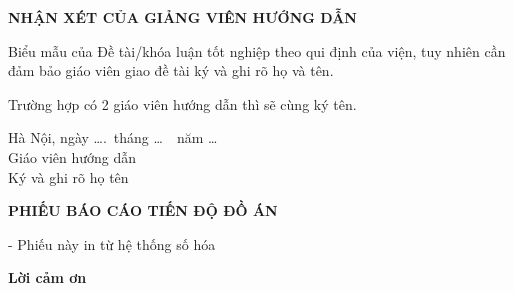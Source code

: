 \documentclass[12pt,a4paper]{report}
\begin{document}
\newpage

\begin{center}
    {\fontsize{13}{16}\selectfont\bfseries NHẬN XÉT CỦA GIẢNG VIÊN HƯỚNG DẪN}
\end{center}

\vspace{0.8cm}

Biểu mẫu của Đề tài/khóa luận tốt nghiệp theo qui định của viện, tuy nhiên cần đảm bảo giáo viên giao đề tài ký và ghi rõ họ và tên.

Trường hợp có 2 giáo viên hướng dẫn thì sẽ cùng ký tên.

\vspace{9cm}

\begin{flushright}
    \begin{minipage}{0.35\textwidth}
        \centering
        Hà Nội, ngày \dots.\ tháng \dots\ \ năm \dots\\[12pt]
        {\fontsize{13}{16}\selectfont Giáo viên hướng dẫn}\\[20pt]
        {\fontsize{10}{12}\selectfont Ký và ghi rõ họ tên}
    \end{minipage}
\end{flushright}

\newpage

\begin{center}
    {\fontsize{13}{16}\selectfont\bfseries PHIẾU BÁO CÁO TIẾN ĐỘ ĐỒ ÁN}
\end{center}

\vspace{1.5cm}

\begin{center}
    {\fontsize{13}{16}\selectfont - Phiếu này in từ hệ thống số hóa}
\end{center}

\newpage

\begin{center}
    {\fontsize{13}{16}\selectfont\bfseries Lời cảm ơn}
\end{center}
\end{document}

